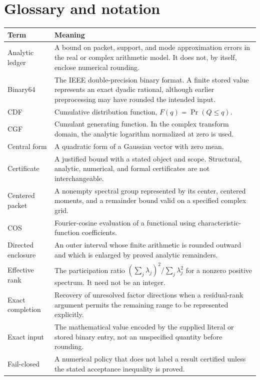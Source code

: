 \chapter{Glossary and notation}\label{app:glossary}
\begingroup
\small
\renewcommand{\arraystretch}{1.08}


\begin{longtable}{@{}P{.25\linewidth}P{.70\linewidth}@{}}
\toprule
Term & Meaning\\
\midrule
\endhead
Analytic ledger & A bound on packet, support, and mode approximation errors in the real or complex arithmetic model. It does not, by itself, enclose numerical rounding.\\
Binary64 & The IEEE double-precision binary format. A finite stored value represents an exact dyadic rational, although earlier preprocessing may have rounded the intended input.\\
CDF & Cumulative distribution function, $F(q)=\Pr(Q\le q)$.\\
CGF & Cumulant generating function. In the complex transform domain, the analytic logarithm normalized at zero is used.\\
Central form & A quadratic form of a Gaussian vector with zero mean.\\
Certificate & A justified bound with a stated object and scope. Structural, analytic, numerical, and formal certificates are not interchangeable.\\
Centered packet & A nonempty spectral group represented by its center, centered moments, and a remainder bound valid on a specified complex grid.\\
COS & Fourier-cosine evaluation of a functional using characteristic-function coefficients.\\
Directed enclosure & An outer interval whose finite arithmetic is rounded outward and which is enlarged by proved analytic remainders.\\
Effective rank & The participation ratio $(\sum_j\lambda_j)^2/\sum_j\lambda_j^2$ for a nonzero positive spectrum. It need not be an integer.\\
Exact completion & Recovery of unresolved factor directions when a residual-rank argument permits the remaining range to be represented explicitly.\\
Exact input & The mathematical value encoded by the supplied literal or stored binary entry, not an unspecified quantity before rounding.\\
Fail-closed & A numerical policy that does not label a result certified unless the stated acceptance inequality is proved.\\

\end{longtable}

